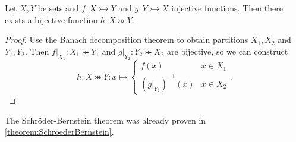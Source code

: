 \begin{corollary}
Let $X,Y$ be sets and $f:X\rightarrowtail Y$ and $g:Y\rightarrowtail X$ injective functions. Then there exists a bijective function $h: X\twoheadrightarrowtail Y$.
\end{corollary}
\begin{proof}
Use the Banach decomposition theorem to obtain partitions $X_1,X_2$ and $Y_1,Y_2$. Then $f|_{X_1}: X_1\twoheadrightarrowtail Y_1$ and $g|_{Y_2}: Y_2 \twoheadrightarrowtail X_2$ are bijective, so we can construct
\[ h: X\twoheadrightarrowtail Y: x \mapsto \begin{cases}
f(x) & x\in X_1 \\ (g|_{Y_2})^{-1}(x) & x\in X_2
\end{cases}. \]
\end{proof}
The Schröder-Bernstein theorem was already proven in \ref{theorem:SchroederBernstein}.


